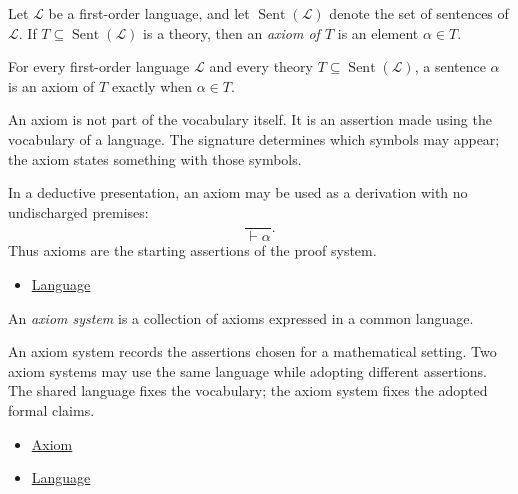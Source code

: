 \begin{definition}[Axiom]
\label{def:axiom}
Let $\mathcal{L}$ be a first-order language, and let
$\operatorname{Sent}(\mathcal{L})$ denote the set of sentences of
$\mathcal{L}$. If $T\subseteq \operatorname{Sent}(\mathcal{L})$ is a theory,
then an \emph{axiom of $T$} is an element $\alpha\in T$.
\end{definition}

\begin{remark*}
For every first-order language $\mathcal{L}$ and every theory
$T\subseteq\operatorname{Sent}(\mathcal{L})$, a sentence $\alpha$ is an axiom
of $T$ exactly when $\alpha\in T$.
\end{remark*}

\begin{remark*}[Interpretation]
An axiom is not part of the vocabulary itself. It is an assertion made using
the vocabulary of a language. The signature determines which symbols may
appear; the axiom states something with those symbols.
\end{remark*}

\begin{remark*}
In a deductive presentation, an axiom may be used as a derivation with no
undischarged premises:
\[
  \frac{}{\vdash \alpha}.
\]
Thus axioms are the starting assertions of the proof system.
\end{remark*}

\begin{dependencies}
\begin{itemize}
  \item \hyperref[def:language]{Language}
\end{itemize}
\end{dependencies}

\begin{definition}
\label{def:axiom-system}
An \emph{axiom system} is a collection of axioms expressed in a common
language.
\end{definition}

\begin{remark*}[Interpretation]
An axiom system records the assertions chosen for a mathematical setting. Two
axiom systems may use the same language while adopting different assertions.
The shared language fixes the vocabulary; the axiom system fixes the adopted
formal claims.
\end{remark*}

\begin{dependencies}
\begin{itemize}
  \item \hyperref[def:axiom]{Axiom}
  \item \hyperref[def:language]{Language}
\end{itemize}
\end{dependencies}

